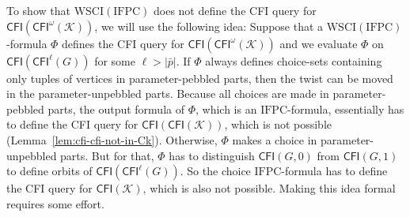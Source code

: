 \documentclass[]{lmcs}
\newcommand{\formA}{\Phi}
\newcommand{\tup}[1]{\bar{#1}}
\newcommand{\GraphClass}{\mathcal{K}}
\newcommand{\IFPC}{\ensuremath{\mathrm{IFPC}}}
\newcommand{\CFImsym}{\mathsf{CFI}^\omega}
\newcommand{\CFIm}[1]{\CFImsym(#1)}
\newcommand{\CFImk}[2]{\mathsf{CFI}^{#1}(#2)}
\newcommand{\WSCIof}[1]{\mathrm{WSCI}(#1)}
\newcommand{\CFIsym}{\mathsf{CFI}}
\newcommand{\CFI}[1]{\CFIsym(#1)}
\begin{document}
To show that $\WSCIof{\IFPC}$ does not define the CFI query for 
$\CFI{\CFIm{\GraphClass}}$, we will use the following idea:
Suppose that a $\WSCIof{\IFPC}$-formula $\formA$ defines the CFI query for 
$\CFI{\CFIm{\GraphClass}}$
and we evaluate $\formA$
on $\CFI{\CFImk{\ell}{G}}$ for some $\ell > |\tup{p}|$.
If $\formA$ always defines choice-sets containing only tuples of vertices in parameter-pebbled parts,
then the twist can be moved in the parameter-unpebbled parts.
Because all choices are made in parameter-pebbled parts,
the output formula of $\formA$, which is an \IFPC{}-formula,
essentially has to define the CFI query for $\CFI{\CFI{\GraphClass}}$,
which is not possible (Lemma~\ref{lem:cfi-cfi-not-in-Ck}).
Otherwise, 
$\formA$ makes a choice in parameter-unpebbled parts.
But for that, $\formA$ has to distinguish $\CFI{G,0}$ from $\CFI{G,1}$
to define orbits of $\CFI{\CFImk{\ell}{G}}$.
So the choice \IFPC{}-formula
has to define the CFI query for $\CFI{\GraphClass}$,
which is also not possible.
Making this idea formal requires some effort.


\newcommand{\GraphClassOrb}{\GraphClass_{\text{orb}}}
\newcommand{\GraphClassCFI}{\GraphClass_{\text{cfi}}}
\end{document}
